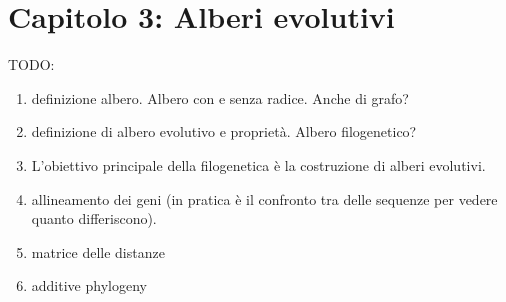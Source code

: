 \chapter{Capitolo 3: Alberi evolutivi}
TODO:
\begin{enumerate}
	\item definizione albero. Albero con e senza radice. Anche di grafo?
	\item definizione di albero evolutivo e proprietà. Albero filogenetico?
	\item L'obiettivo principale della filogenetica è la costruzione di alberi evolutivi.
	\item allineamento dei geni (in pratica è il confronto tra delle sequenze per vedere quanto differiscono).
	\item matrice delle distanze
	\item additive phylogeny
\end{enumerate}
